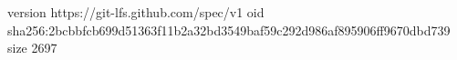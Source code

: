 version https://git-lfs.github.com/spec/v1
oid sha256:2bcbbfcb699d51363f11b2a32bd3549baf59c292d986af895906ff9670dbd739
size 2697
